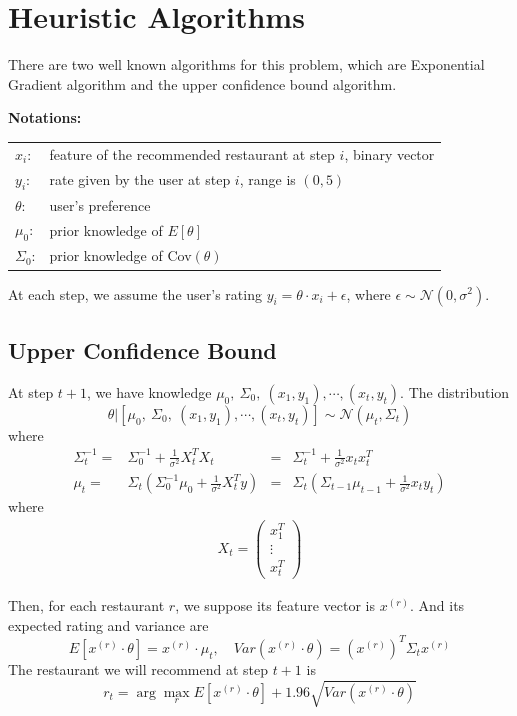 \documentclass{article}
\theoremstyle{plain}
\theoremstyle{definition}
\begin{document}
\section{Heuristic Algorithms}
There are two well known algorithms for this problem, which are Exponential Gradient algorithm and the upper confidence bound algorithm.\

\textbf{Notations: }

\begin{center}
\begin{tabular}{ll}
${x}_i$: & feature of the recommended restaurant at step $i$, binary vector\\
$y_i$: & rate given by the user at step $i$, range is $(0,5)$\\
${\theta}$: & user's preference\\
${\mu_0}$: & prior knowledge of ${E}[{\theta}]$ \\
$\Sigma_0$: & prior knowledge of Cov$(\theta)$
\end{tabular}
\end{center}

At each step, we assume the user's rating $y_i = \theta\cdot {x}_i+\epsilon$, where $\epsilon\sim\mathcal{N}(0,\sigma^2)$.

\subsection{Upper Confidence Bound}
At step $t+1$, we have knowledge $\mu_0,\ \Sigma_0,\ ({x}_1, y_1), \cdots, ({x}_{t}, y_t)$. The distribution 
\[\theta | [ \mu_0,\ \Sigma_0,\ ({x}_1, y_1), \cdots, ({x}_{t}, y_t) ] \sim \mathcal{N}(\mu_{t}, \Sigma_{t}) \]
where 
\begin{align}
\Sigma_{t}^{-1} = & \Sigma_0^{-1}+\frac{1}{\sigma^2}X_t^TX_t &=& \Sigma_t^{-1} + \frac{1}{\sigma^2}{x}_t{x}_t^T\\
\mu_t = & \Sigma_t\left( \Sigma_0^{-1}\mu_0 + \frac{1}{\sigma^2}X_t^Ty \right) &= &\Sigma_t\left(\Sigma_{t-1}\mu_{t-1}+\frac{1}{\sigma^2}{x}_t y_t\right)
\end{align}
where 
\begin{align*}
X_t = \left(
\begin{array}{c}
{x}_1^T\\
\vdots\\
{x}_t^T
\end{array}\right)
\end{align*}

Then, for each restaurant $r$, we suppose its feature vector is ${x}^{(r)}$. And its expected rating and variance are
\[E[{x}^{(r)}\cdot \theta] = {x}^{(r)}\cdot \mu_t,\quad Var({x}^{(r)}\cdot \theta) =({x}^{(r)})^T\Sigma_t {x}^{(r)} \]
The restaurant we will recommend at step $t+1$ is
\[r_t = \arg\max_r E[{x}^{(r)}\cdot \theta] + 1.96 \sqrt{Var({x}^{(r)}\cdot \theta)}\]
\end{document}

